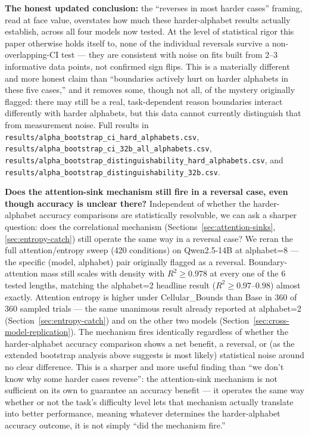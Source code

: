 \documentclass[11pt]{article}
\begin{document}
\textbf{The honest updated conclusion:} the ``reverses in most harder cases'' framing, read at face value, overstates how much these harder-alphabet results actually establish, across all four models now tested. At the level of statistical rigor this paper otherwise holds itself to, none of the individual reversals survive a non-overlapping-CI test --- they are consistent with noise on fits built from 2--3 informative data points, not confirmed sign flips. This is a materially different and more honest claim than ``boundaries actively hurt on harder alphabets in these five cases,'' and it removes some, though not all, of the mystery originally flagged: there may still be a real, task-dependent reason boundaries interact differently with harder alphabets, but this data cannot currently distinguish that from measurement noise. Full results in \texttt{results/alpha\_bootstrap\_ci\_hard\_alphabets.csv}, \texttt{results/alpha\_bootstrap\_ci\_32b\_all\_alphabets.csv}, \texttt{results/alpha\_bootstrap\_distinguishability\_hard\_alphabets.csv}, and \texttt{results/alpha\_bootstrap\_distinguishability\_32b.csv}.

\textbf{Does the attention-sink mechanism still fire in a reversal case, even though accuracy is unclear there?} Independent of whether the harder-alphabet accuracy comparisons are statistically resolvable, we can ask a sharper question: does the correlational mechanism (Sections~\ref{sec:attention-sinks}, \ref{sec:entropy-catch}) still operate the same way in a reversal case? We reran the full attention/entropy sweep (420 conditions) on Qwen2.5-14B at alphabet=8 --- the specific (model, alphabet) pair originally flagged as a reversal. Boundary-attention mass still scales with density with $R^2 \geq 0.978$ at every one of the 6 tested lengths, matching the alphabet=2 headline result ($R^2 \geq 0.97$--$0.98$) almost exactly. Attention entropy is higher under Cellular\_Bounds than Base in 360 of 360 sampled trials --- the same unanimous result already reported at alphabet=2 (Section~\ref{sec:entropy-catch}) and on the other two models (Section~\ref{sec:cross-model-replication}). The mechanism fires identically regardless of whether the harder-alphabet accuracy comparison shows a net benefit, a reversal, or (as the extended bootstrap analysis above suggests is most likely) statistical noise around no clear difference. This is a sharper and more useful finding than ``we don't know why some harder cases reverse'': the attention-sink mechanism is not sufficient on its own to guarantee an accuracy benefit --- it operates the same way whether or not the task's difficulty level lets that mechanism actually translate into better performance, meaning whatever determines the harder-alphabet accuracy outcome, it is not simply ``did the mechanism fire.''
\end{document}
